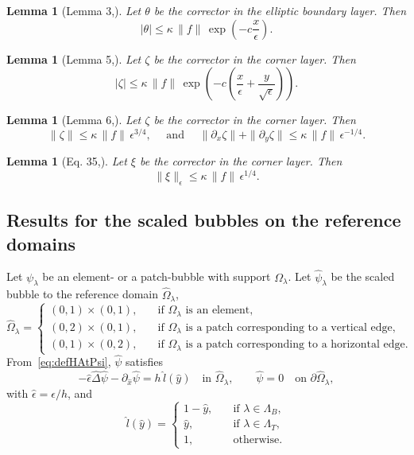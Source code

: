 \documentclass{article}
\newtheorem{lemma}[thm]{Lemma}
\begin{document}
\begin{appendix}
\begin{lemma}[Lemma 3,\cite{GieEtAl:13}]\label{Temam:Lemma3}
Let $\theta$ be the corrector in the elliptic boundary layer. Then
\[
|\theta|\leq \kappa \, \|f\| \, \exp(-c\frac{x}{\epsilon}).
\]
\end{lemma}
\begin{lemma}[Lemma 5,\cite{GieEtAl:13}]\label{Temam:Lemma5}
Let $\zeta$ be the corrector in the corner layer. Then
\[
|\zeta|\leq \kappa \, \|f\| \, \exp(-c\left(\frac{x}{\epsilon}+\frac{y}{\sqrt{\epsilon}}\right)).
\]
\end{lemma}

\begin{lemma}[Lemma 6,\cite{GieEtAl:13}]\label{Temam:Lemma6}
Let $\zeta$ be the corrector in the corner layer. Then
\[
\|\zeta\|\leq \kappa \, \|f\| \, \epsilon^{3/4},
\quad \text{ and }\quad
\|\partial_x\zeta\| + \|\partial_y\zeta\| \leq  
\kappa \, \|f\| \,\epsilon^{-1/4}.
\]
\end{lemma}

\begin{lemma}[Eq. 35,\cite{GieEtAl:13}]\label{Temam:eq35}
Let $\xi$ be the corrector in the corner layer. Then
\[
\|\xi\|_\epsilon\leq \kappa \, \|f\| \, \epsilon^{1/4}.
\]
\end{lemma}

\subsection{Results for the scaled bubbles on the reference domains}

Let $\psi_\lambda$ be an element- or a patch-bubble with support $\Omega_\lambda$. Let $\hat{\psi}_\lambda$ be the scaled bubble to the reference domain $\hat \Omega_\lambda$,
\[
\hat \Omega_\lambda = 
\begin{cases}
(0,1)\times(0,1), \quad&\text{if $\Omega_\lambda$ is an element,} \\
(0,2)\times(0,1), \quad&\text{if $\Omega_\lambda$ is a patch corresponding to a vertical edge,}\\
(0,1)\times(0,2), \quad&\text{if $\Omega_\lambda$ is a patch corresponding to a horizontal edge.}
\end{cases}
\]
From~\eqref{eq:defHAtPsi},  $\hat{\psi}$ satisfies
\[
-\hat{\epsilon} \hat{\Delta} \hat{\psi} - \partial_{\hat{x}}\hat{\psi} = h \, \hat l(\hat y)\quad \text{in }\hat{\Omega}_\lambda,\qquad
   \hat{\psi} = 0\quad\text{on }\partial\hat{\Omega}_\lambda,
\]
with $\hat\epsilon = \epsilon/h$, and 
\[
\hat l(\hat y) = 
\begin{cases}
1-\hat y, \quad&\text{if $\lambda \in \Lambda_B$}, \\
\hat y, \quad&\text{if $\lambda \in \Lambda_T$}, \\
1, \quad&\text{otherwise}.
\end{cases}
\]



\end{appendix}
\end{document}
